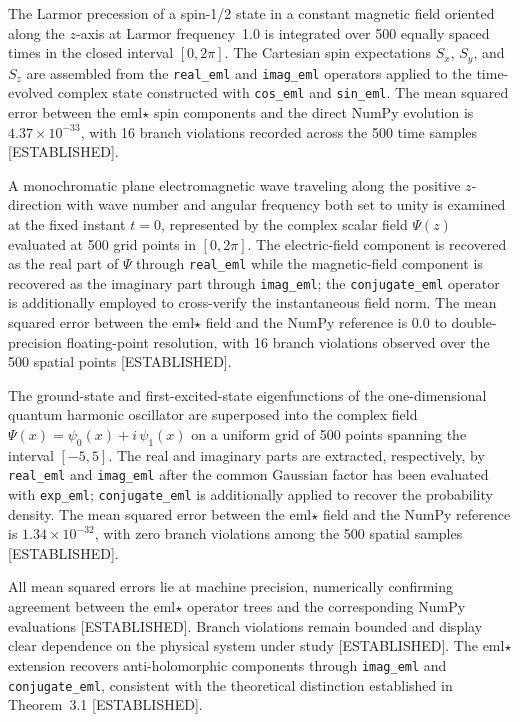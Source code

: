 \documentclass[11pt,a4paper]{article}
\begin{document}
The Larmor precession of a spin-1/2 state in a constant magnetic field oriented along the $z$-axis at Larmor frequency~1.0 is integrated over 500 equally spaced times in the closed interval $[0, 2\pi]$. The Cartesian spin expectations $S_x$, $S_y$, and $S_z$ are assembled from the \texttt{real\_eml} and \texttt{imag\_eml} operators applied to the time-evolved complex state constructed with \texttt{cos\_eml} and \texttt{sin\_eml}. The mean squared error between the eml$\star$ spin components and the direct NumPy evolution is $4.37 \times 10^{-33}$, with 16 branch violations recorded across the 500 time samples [ESTABLISHED].

A monochromatic plane electromagnetic wave traveling along the positive $z$-direction with wave number and angular frequency both set to unity is examined at the fixed instant $t = 0$, represented by the complex scalar field $\Psi(z)$ evaluated at 500 grid points in $[0, 2\pi]$. The electric-field component is recovered as the real part of $\Psi$ through \texttt{real\_eml} while the magnetic-field component is recovered as the imaginary part through \texttt{imag\_eml}; the \texttt{conjugate\_eml} operator is additionally employed to cross-verify the instantaneous field norm. The mean squared error between the eml$\star$ field and the NumPy reference is $0.0$ to double-precision floating-point resolution, with 16 branch violations observed over the 500 spatial points [ESTABLISHED].

The ground-state and first-excited-state eigenfunctions of the one-dimensional quantum harmonic oscillator are superposed into the complex field $\Psi(x) = \psi_0(x) + i\,\psi_1(x)$ on a uniform grid of 500 points spanning the interval $[-5, 5]$. The real and imaginary parts are extracted, respectively, by \texttt{real\_eml} and \texttt{imag\_eml} after the common Gaussian factor has been evaluated with \texttt{exp\_eml}; \texttt{conjugate\_eml} is additionally applied to recover the probability density. The mean squared error between the eml$\star$ field and the NumPy reference is $1.34 \times 10^{-32}$, with zero branch violations among the 500 spatial samples [ESTABLISHED].

All mean squared errors lie at machine precision, numerically confirming agreement between the eml$\star$ operator trees and the corresponding NumPy evaluations [ESTABLISHED]. Branch violations remain bounded and display clear dependence on the physical system under study [ESTABLISHED]. The eml$\star$ extension recovers anti-holomorphic components through \texttt{imag\_eml} and \texttt{conjugate\_eml}, consistent with the theoretical distinction established in Theorem~3.1 [ESTABLISHED].
\end{document}
